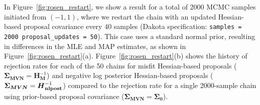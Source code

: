 In Figure~\ref{fig:rosen_restart}, we show a result for a total of
2000 MCMC samples initiated from $(-1,1)$, where we restart the chain
with an updated Hessian-based proposal covariance every 40
samples (Dakota specification: \texttt{samples = 2000
  proposal\_updates = 50}).  This case uses a standard normal prior,
resulting in differences in the MLE and MAP estimates, as shown in
Figure~\ref{fig:rosen_restart}(a).  Figure~\ref{fig:rosen_restart}(b)
shows the history of rejection rates for each of the 50 chains for
misfit Hessian-based proposals 
($\boldsymbol{\Sigma_{MVN}} = \boldsymbol{H}_{\boldsymbol{M}}^{-1}$)
and negative log posterior Hessian-based proposals 
($\boldsymbol{\Sigma_{MVN}} = \boldsymbol{H}_{\boldsymbol{\rm nlpost}}^{-1}$)
compared to the rejection rate for a single 2000-sample chain 
using prior-based proposal covariance 
($\boldsymbol{\Sigma_{MVN}} = \boldsymbol{\Sigma_0}$).

